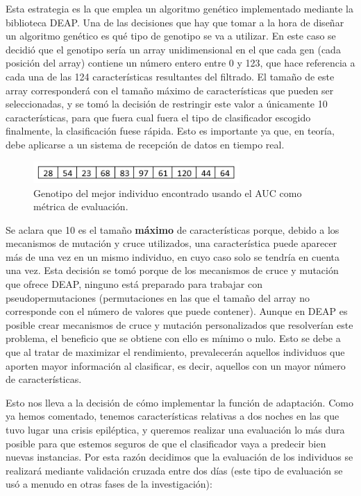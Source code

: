 Esta estrategia es la que emplea un algoritmo genético implementado mediante la biblioteca DEAP. Una de las decisiones que hay que tomar a la hora de diseñar un algoritmo genético es qué tipo de genotipo se va a utilizar. En este caso se decidió que el genotipo sería un array unidimensional en el que cada gen (cada posición del array) contiene un número entero entre 0 y 123, que hace referencia a cada una de las 124 características resultantes del filtrado. El tamaño de este array corresponderá con el tamaño máximo de características que pueden ser seleccionadas, y se tomó la decisión de restringir este valor a únicamente 10 características, para que fuera cual fuera el tipo de clasificador escogido finalmente, la clasificación fuese rápida. Esto es importante ya que, en teoría, debe aplicarse a un sistema de recepción de datos en tiempo real. 

\begin{figure}[H]
	\centering
	\includegraphics[width=0.7\textwidth]{../img/genotipo.png}
	\caption{Genotipo del mejor individuo encontrado usando el AUC como métrica de evaluación.}
	\label{fig:genotipo}
\end{figure}

Se aclara que 10 es el tamaño \textbf{máximo} de características porque, debido a los mecanismos de mutación y cruce utilizados, una característica puede aparecer más de una vez en un mismo individuo, en cuyo caso solo se tendría en cuenta una vez. Esta decisión se tomó porque de los mecanismos de cruce y mutación que ofrece DEAP, ninguno está preparado para trabajar con pseudopermutaciones (permutaciones en las que el tamaño del array no corresponde con el número de valores que puede contener). Aunque en DEAP es posible crear mecanismos de cruce y mutación personalizados que resolverían este problema, el beneficio que se obtiene con ello es mínimo o nulo. Esto se debe a que al tratar de maximizar el rendimiento, prevalecerán aquellos individuos que aporten mayor información al clasificar, es decir, aquellos con un mayor número de características.

Esto nos lleva a la decisión de cómo implementar la función de adaptación. Como ya hemos comentado, tenemos características relativas a dos noches en las que tuvo lugar una crisis epiléptica, y queremos realizar una evaluación lo más dura posible para que estemos seguros de que el clasificador vaya a predecir bien nuevas instancias. Por esta razón decidimos que la evaluación de los individuos se realizará mediante validación cruzada entre dos días (este tipo de evaluación se usó a menudo en otras fases de la investigación): 

